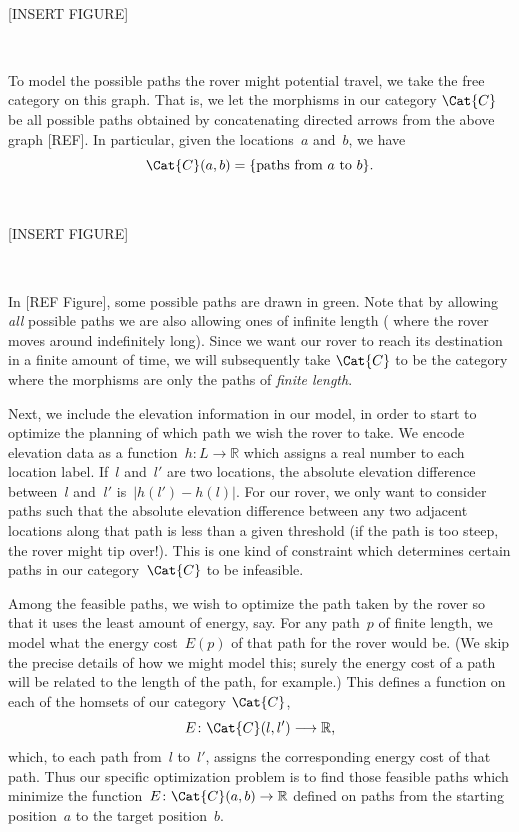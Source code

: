 \

[INSERT FIGURE]

\

To model the possible paths the rover might potential travel, we take the free category on this graph. That is, we let the morphisms in our category $\Cat{C}$ be all possible paths obtained by concatenating directed arrows from the above graph [REF]. In particular, given the locations~$a$ and~$b$, we have 
\begin{equation}
\Cat{C}(a, b) = \{ \text{paths from } a \text{ to } b \}.
\end{equation}

\

[INSERT FIGURE]

\

In [REF Figure], some possible paths are drawn in green. Note that by allowing \emph{all} possible paths we are also allowing ones of infinite length ( where the rover moves around indefinitely long). Since we want our rover to reach its destination in a finite amount of time, we will subsequently take $\Cat{C}$ to be the category where the morphisms are only the paths of \emph{finite length}. 

Next, we include the elevation information in our model, in order to start to optimize the planning of which path we wish the rover to take. We encode elevation data as a function~$h \colon L \to \mathbb{R}$ which assigns a real number to each location label. If~$l$ and~$l'$ are two locations, the absolute elevation difference between~$l$ and $~l'$ is~$\vert h(l') - h(l) \vert$. For our rover, we only want to consider paths such that the absolute elevation difference between any two adjacent locations along that path is less than a given threshold (if the path is too steep, the rover might tip over!). This is one kind of constraint which determines certain paths in our category~$\Cat{C}$ to be infeasible. 

Among the feasible paths, we wish to optimize the path taken by the rover so that it uses the least amount of energy, say.  For any path~$p$ of finite length, we model what the energy cost~$E(p)$ of that path for the rover would be. (We skip the precise details of how we might model this; surely the energy cost of a path will be related to the length of the path, for example.) This defines a function on each of the homsets of our category $\Cat{C}$, 
\begin{equation}
E \colon \Cat{C}(l, l') \longrightarrow \mathbb{R}, 
\end{equation}
which, to each path from~$l$ to~$l'$, assigns the corresponding energy cost of that path. Thus our specific optimization problem is to find those feasible paths which minimize the function~$E\colon \Cat{C}(a,b) \to \mathbb{R}$ defined on paths from the starting position~$a$ to the target position~$b$. 







